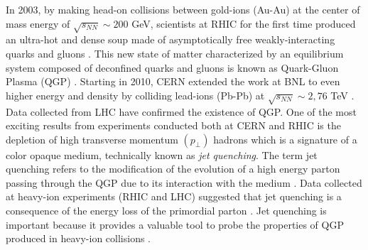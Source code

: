 \documentclass[twocolumn,secnumarabic,amssymb, nobibnotes, aps, prd,10pt]{revtex4-1}
\begin{document}
In 2003, by making head-on collisions between gold-ions (Au-Au) at the center of mass energy of $\sqrt{s_{NN}} \sim 200$ GeV, scientists at RHIC for the first time produced an ultra-hot and dense soup made of asymptotically free weakly-interacting quarks and gluons \cite{Gyulassy:2004zy,Adcox:2004mh,Arsene:2004fa,Back:2004je}. This new state of matter characterized by an equilibrium system composed of deconfined quarks and gluons is known as Quark-Gluon Plasma (QGP) \cite{Adams:2005dq, Heinz:2000bk}. Starting in 2010, CERN extended the work at BNL to even higher energy and density by colliding lead-ions (Pb-Pb) at $\sqrt{s_{NN}}\sim 2,76$ TeV \cite{Aad:2010bu, Chatrchyan:2011pe, Aamodt:2010jd, Aamodt:2010pa}. Data collected from LHC have confirmed the existence of QGP. One of the most exciting results from experiments conducted both at CERN and RHIC is the depletion of high transverse momentum $(p_\perp)$ hadrons \cite{Aiola:2014cja, Chatrchyan:2011sx, ALICE:2012ab} which is a signature of a color opaque medium, technically known as \textit{jet quenching}. The term jet quenching refers to the modification of the evolution of a high energy parton passing through the QGP due to its interaction with the medium \cite{Armesto:2015ioy}. Data collected at heavy-ion experiments (RHIC and LHC) suggested that jet quenching is a consequence of the energy loss of the primordial parton \cite{Antinori:2005tu, Qin:2015srf, Lee:2013bka, Gyulassy:2003mc}. Jet quenching is important because it provides a valuable tool to probe the properties of QGP produced in heavy-ion collisions \cite{Armesto:2011ht}.
\end{document}
